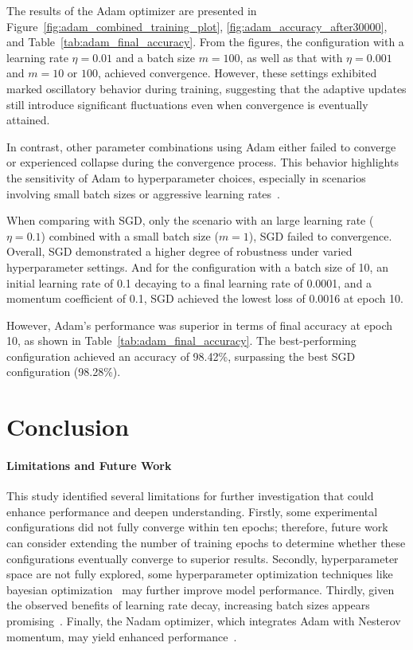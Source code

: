 The results of the Adam optimizer are presented in Figure~\ref{fig:adam_combined_training_plot}, \ref{fig:adam_accuracy_after30000}, and Table~\ref{tab:adam_final_accuracy}. From the figures, the configuration with a learning rate $\eta=0.01$ and a batch size $m=100$, as well as that with $\eta=0.001$ and $m=10$ or $100$, achieved convergence. However, these settings exhibited marked oscillatory behavior during training, suggesting that the adaptive updates still introduce significant fluctuations even when convergence is eventually attained.

In contrast, other parameter combinations using Adam either failed to converge or experienced collapse during the convergence process. This behavior highlights the sensitivity of Adam to hyperparameter choices, especially in scenarios involving small batch sizes or aggressive learning rates~\cite{li2024surge}.

When comparing with SGD, only the scenario with an large learning rate ($\eta=0.1$) combined with a small batch size ($m=1$), SGD failed to convergence. Overall, SGD demonstrated a higher degree of robustness under varied hyperparameter settings. And for the configuration with a batch size of 10, an initial learning rate of 0.1 decaying to a final learning rate of 0.0001, and a momentum coefficient of 0.1, SGD achieved the lowest loss of 0.0016 at epoch 10.

However, Adam's performance was superior in terms of final accuracy at epoch 10, as shown in Table~\ref{tab:adam_final_accuracy}. The best-performing configuration achieved an accuracy of 98.42\%, surpassing the best SGD configuration (98.28\%).

\section{Conclusion}
\paragraph{Limitations and Future Work}
This study identified several limitations for further investigation that could enhance performance and deepen understanding. Firstly, some experimental configurations did not fully converge within ten epochs; therefore, future work can consider extending the number of training epochs to determine whether these configurations eventually converge to superior results. Secondly, hyperparameter space are not fully explored, some hyperparameter optimization techniques like bayesian optimization~\cite{Frazier2018} may further improve model performance. Thirdly, given the observed benefits of learning rate decay, increasing batch sizes appears promising~\cite{smith2017dont}. Finally, the Nadam optimizer, which integrates Adam with Nesterov momentum, may yield enhanced performance~\cite{tato2018improving}.

